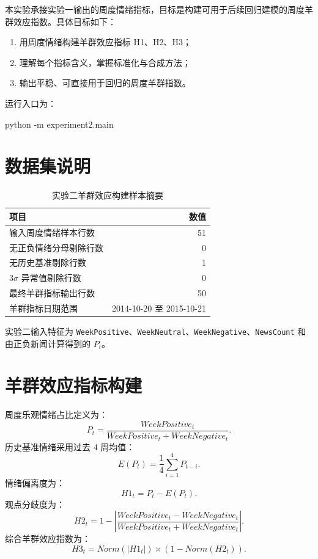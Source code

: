 \documentclass[UTF8,a4paper,12pt]{ctexart}
\begin{document}
本实验承接实验一输出的周度情绪指标，目标是构建可用于后续回归建模的周度羊群效应指数。具体目标如下：

\begin{enumerate}
    \item 用周度情绪构建羊群效应指标 H1、H2、H3；
    \item 理解每个指标含义，掌握标准化与合成方法；
    \item 输出平稳、可直接用于回归的周度羊群指数。
\end{enumerate}

运行入口为：
\begin{CodeBlock}
python -m experiment2.main
\end{CodeBlock}

\section{数据集说明}

\begin{table}[H]
\centering
\caption{实验二羊群效应构建样本摘要}
\begin{tabular}{lr}
\toprule
项目 & 数值 \\
\midrule
输入周度情绪样本行数 & 51 \\
无正负情绪分母剔除行数 & 0 \\
无历史基准剔除行数 & 1 \\
3\(\sigma\) 异常值剔除行数 & 0 \\
最终羊群指标输出行数 & 50 \\
羊群指标日期范围 & 2014-10-20 至 2015-10-21 \\
\bottomrule
\end{tabular}
\end{table}

实验二输入特征为 \texttt{WeekPositive}、\texttt{WeekNeutral}、\texttt{WeekNegative}、\texttt{NewsCount} 和由正负新闻计算得到的 \(P_t\)。

\section{羊群效应指标构建}

周度乐观情绪占比定义为：
\begin{equation}
P_t=\frac{WeekPositive_t}{WeekPositive_t+WeekNegative_t}.
\end{equation}
历史基准情绪采用过去 4 周均值：
\begin{equation}
E(P_t)=\frac{1}{4}\sum_{i=1}^{4}P_{t-i}.
\end{equation}
情绪偏离度为：
\begin{equation}
H1_t=P_t-E(P_t).
\end{equation}
观点分歧度为：
\begin{equation}
H2_t=1-\left|\frac{WeekPositive_t-WeekNegative_t}{WeekPositive_t+WeekNegative_t}\right|.
\end{equation}
综合羊群效应指数为：
\begin{equation}
H3_t=Norm(|H1_t|)\times(1-Norm(H2_t)).
\end{equation}
\end{document}
